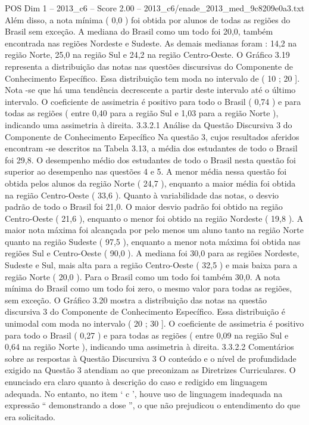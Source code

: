 \begin{textsample}{POS Dim 1 – 2013\_c6 – Score 2.00 – 2013\_c6/enade\_2013\_med\_9c8209e0a3.txt}
Além disso, a nota mínima ( 0,0 ) foi obtida por alunos de todas as regiões do Brasil sem exceção.
A mediana do Brasil como um todo foi 20,0, também encontrada nas regiões Nordeste e Sudeste.
As demais medianas foram : 14,2 na região Norte, 25,0 na região Sul e 24,2 na região Centro-Oeste.
O Gráfico 3.19 representa a distribuição das notas nas questões discursivas do Componente de Conhecimento Específico.
Essa distribuição tem moda no intervalo de ( 10 ; 20 ].
Nota -se que há uma tendência decrescente a partir deste intervalo até o último intervalo.
O coeficiente de assimetria é positivo para todo o Brasil ( 0,74 ) e para todas as regiões ( entre 0,40 para a região Sul e 1,03 para a região Norte ), indicando uma assimetria à direita. 3.3.2.1 Análise da Questão Discursiva 3 do Componente de Conhecimento Específico Na questão 3, cujos resultados aferidos encontram -se descritos na Tabela 3.13, a média dos estudantes de todo o Brasil foi 29,8.
O desempenho médio dos estudantes de todo o Brasil nesta questão foi superior ao desempenho nas questões 4 e 5.
A menor média nessa questão foi obtida pelos alunos da região Norte ( 24,7 ), enquanto a maior média foi obtida na região Centro-Oeste ( 33,6 ).
Quanto à variabilidade das notas, o desvio padrão de todo o Brasil foi 21,0.
O maior desvio padrão foi obtido na região Centro-Oeste ( 21,6 ), enquanto o menor foi obtido na região Nordeste ( 19,8 ).
A maior nota máxima foi alcançada por pelo menos um aluno tanto na região Norte quanto na região Sudeste ( 97,5 ), enquanto a menor nota máxima foi obtida nas regiões Sul e Centro-Oeste ( 90,0 ).
A mediana foi 30,0 para as regiões Nordeste, Sudeste e Sul, mais alta para a região Centro-Oeste ( 32,5 ) e mais baixa para a região Norte ( 20,0 ).
Para o Brasil como um todo foi também 30,0.
A nota mínima do Brasil como um todo foi zero, o mesmo valor para todas as regiões, sem exceção.
O Gráfico 3.20 mostra a distribuição das notas na questão discursiva 3 do Componente de Conhecimento Específico.
Essa distribuição é unimodal com moda no intervalo ( 20 ; 30 ].
O coeficiente de assimetria é positivo para todo o Brasil ( 0,27 ) e para todas as regiões ( entre 0,09 na região Sul e 0,64 na região Norte ), indicando uma assimetria à direita. 3.3.2.2 Comentários sobre as respostas à Questão Discursiva 3 O conteúdo e o nível de profundidade exigido na Questão 3 atendiam ao que preconizam as Diretrizes Curriculares.
O enunciado era claro quanto à descrição do caso e redigido em linguagem adequada.
No entanto, no item ‘ c ’, houve uso de linguagem inadequada na expressão “ demonstrando a dose ”, o que não prejudicou o entendimento do que era solicitado.

\end{textsample}
